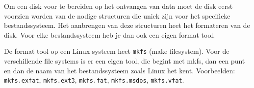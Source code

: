 Om een disk voor te bereiden op het ontvangen van data moet de disk eerst voorzien worden van de nodige structuren die uniek zijn voor het specifieke bestandssysteem. Het aanbrengen van deze structuren heet het formateren van de disk. Voor elke bestandssysteem heb je dan ook een eigen format tool.

De format tool op een Linux systeem heet \texttt{mkfs} (make filesystem). Voor de verschillende file systems is er een eigen tool, die begint met mkfs, dan een punt en dan de naam van het bestandssysteem zoals Linux het kent. Voorbeelden: \texttt{mkfs.exfat}, \texttt{mkfs.ext3}, \texttt{mkfs.fat}, \texttt{mkfs.msdos}, \texttt{mkfs.vfat}.

